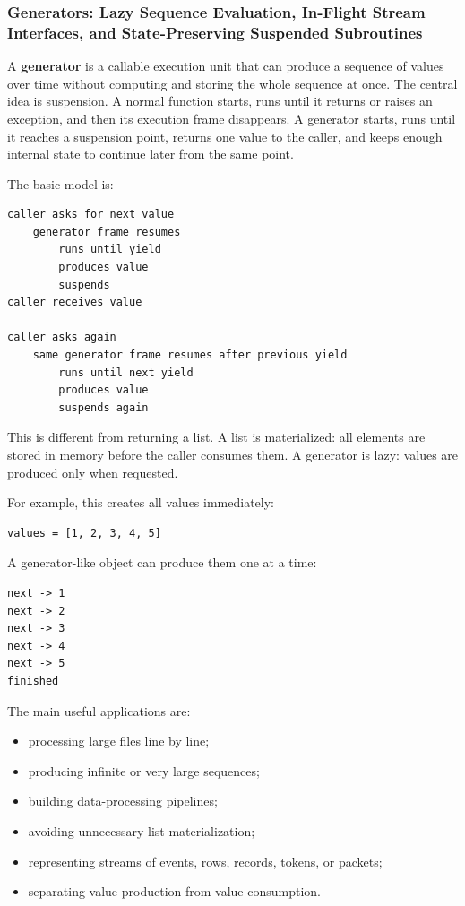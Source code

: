 \subsubsection{Generators: Lazy Sequence Evaluation, In-Flight Stream Interfaces, and State-Preserving Suspended Subroutines}

A \textbf{generator} is a callable execution unit that can produce a sequence of values over time without computing and storing the whole sequence at once. The central idea is suspension. A normal function starts, runs until it returns or raises an exception, and then its execution frame disappears. A generator starts, runs until it reaches a suspension point, returns one value to the caller, and keeps enough internal state to continue later from the same point.

The basic model is:

\begin{verbatim}
caller asks for next value
    generator frame resumes
        runs until yield
        produces value
        suspends
caller receives value

caller asks again
    same generator frame resumes after previous yield
        runs until next yield
        produces value
        suspends again
\end{verbatim}

This is different from returning a list. A list is materialized: all elements are stored in memory before the caller consumes them. A generator is lazy: values are produced only when requested.

For example, this creates all values immediately:

\begin{verbatim}
values = [1, 2, 3, 4, 5]
\end{verbatim}

A generator-like object can produce them one at a time:

\begin{verbatim}
next -> 1
next -> 2
next -> 3
next -> 4
next -> 5
finished
\end{verbatim}

The main useful applications are:

\begin{itemize}
    \item processing large files line by line;
    \item producing infinite or very large sequences;
    \item building data-processing pipelines;
    \item avoiding unnecessary list materialization;
    \item representing streams of events, rows, records, tokens, or packets;
    \item separating value production from value consumption.
\end{itemize}

